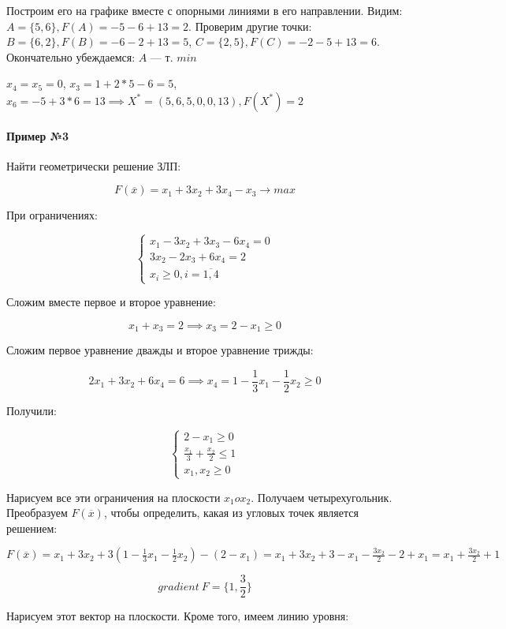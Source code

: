 \documentclass{article}
\begin{document}
Построим его на графике вместе с опорными линиями в его направлении. Видим: $A = \{ 5, 6 \}, F(A) = -5 - 6 + 13 = 2$. Проверим другие точки: $B = \{ 6, 2 \}, F(B) = -6 - 2 + 13 = 5$, $C = \{ 2, 5 \}, F(C) = -2 - 5 + 13 = 6$. Окончательно убеждаемся: $A$ — т. $min$

$x_4 = x_5 = 0$, $x_3 = 1 + 2 * 5 - 6 = 5$, $x_6 = -5 + 3 * 6 = 13 \implies X^{*} = (5, 6, 5, 0, 0, 13), F(X^{*}) = 2$

\paragraph{Пример №3}

Найти геометрически решение ЗЛП:

$$
F(\overline{x}) = x_1 + 3x_2 + 3x_4 - x_3 \to max
$$

При ограничениях:

$$
\begin{cases}
    x_1 - 3x_2 + 3x_3 - 6x_4 = 0 \\
    3x_2 - 2x_3 + 6x_4 = 2 \\
    x_{i} \ge 0, i = \overline{1, 4}
\end{cases}
$$

Сложим вместе первое и второе уравнение:

$$
x_1 + x_3 = 2 \implies x_3 = 2 - x_1 \ge 0
$$

Сложим первое уравнение дважды и второе уравнение трижды:

$$
2x_1 + 3x_2 + 6x_4 = 6 \implies x_4 = 1 - \frac{1}{3} x_1 - \frac{1}{2}x_2 \ge 0
$$

Получили:

$$
\begin{cases}
    2 - x_1 \ge 0 \\
    \frac{x_1}{3} + \frac{x_2}{2} \le 1 \\
    x_1, x_2 \ge 0
\end{cases}
$$

Нарисуем все эти ограничения на плоскости $x_1 o x_2$. Получаем четырехугольник. Преобразуем $F(\overline{x})$, чтобы определить, какая из угловых точек является решением:

$F(\overline{x}) = x_1 + 3x_2 + 3 (1 - \frac{1}{3} x_1 - \frac{1}{2} x_2) - (2 - x_1) = x_1 + 3x_2 + 3 - x_1 - \frac{3x_2}{2} - 2 + x_1 = x_1 + \frac{3x_2}{2} + 1$

$$
gradient \ F = \{ 1, \frac{3}{2} \}
$$

Нарисуем этот вектор на плоскости. Кроме того, имеем линию уровня:
\end{document}
